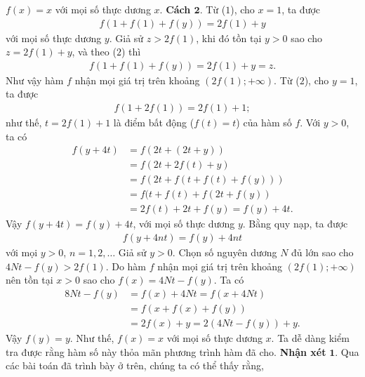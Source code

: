 \begin{multicols}{2}
			$
			f(x)=x$ với mọi số thực dương $x$.
			\vskip 0.1cm
			\textbf{\color{hoccungpi}Cách $\pmb{2.}$} 
			Từ ($1$), cho $x=1$, ta được
			\begin{align*}
				f\left( {1 + f(1) + f(y)} \right) = 2f(1) + y\tag{$2$}
			\end{align*}
			với mọi số thực dương $y$.
			Giả sử $z>2f(1)$, khi đó tồn tại $y>0$ sao cho $z=2f(1)+y$, và theo ($2$) thì
			\begin{align*}
				f\left( {1 + f(1) + f(y)} \right) = 2f(1) + y=z.
			\end{align*}
			Như vậy hàm $f$ nhận mọi giá trị trên khoảng $\left( {2f(1); + \infty } \right)$.
			Từ ($2$), cho $y=1$, ta được
			\begin{align*}
				f\left( {1 + 2f(1)} \right) = 2f(1) + 1;
			\end{align*}
			như thế, $t=2f(1)+1$ là điểm bất động ($f(t)=t$) của hàm số $f$. Với $y>0$, ta có
			\begin{align*}
				f\left( {y + 4t} \right) &= f\left( {2t + (2t + y)} \right)\\
				&= f\left( {2t + 2f(t) + y} \right)\\
				&	= f\left( {2t + f\left( {t + f(t) + f(y)} \right)} \right)\\
				&= f(t + f(t) + f\left( {2t + f(y)} \right)\\
				&= 2f\left( t \right) + 2t + f(y)
				= f(y) + 4t.
			\end{align*}Vậy $	f\left( {y + 4t} \right)= f(y) + 4t$, với mọi số thực dương $y$. Bằng quy nạp, ta được
			\begin{align*}
				f\left( {y + 4nt} \right) = f(y) + 4nt
			\end{align*}
			với mọi  $y>0$, $n=1,2,\ldots$
			Giả sử $y>0$. Chọn số nguyên dương $N$ đủ lớn sao cho
			$4Nt-f(y)>2f(1)$. Do hàm $f$ nhận mọi giá trị trên khoảng $\left( {2f(1); + \infty } \right)$
			nên tồn tại $x>0$ sao cho $f(x)=4Nt-f(y)$.
			Ta có
			\begin{align*}
				8Nt - f(y) &= f(x) + 4Nt = f\left( {x + 4Nt} \right)\\
				& = f\left( {x + f(x) + f(y)} \right)\\
				&= 2f(x) \!+\! y \!=\! 2\left( {4Nt \!-\! f(y)} \right) \!+\! y.
			\end{align*}Vậy $f(y) = y$. Như thế, $f(x)=x$ với mọi số thực dương $x$. Ta dễ dàng kiểm tra được rằng hàm số này thỏa mãn phương trình hàm đã cho.
	\vskip 0.1cm
	\textbf{\color{hoccungpi}Nhận xét} $\pmb{1.}$
		Qua các bài toán đã trình bày ở trên, chúng ta có thể thấy rằng, 

\end{multicols}
